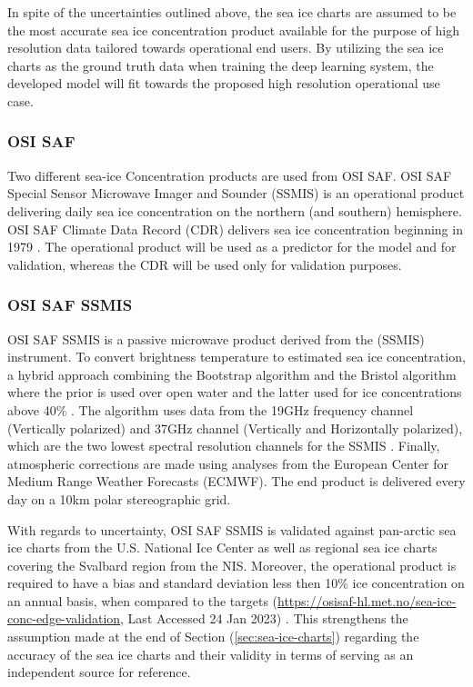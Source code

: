 \documentclass[../main/thesis.tex]{subfiles}
\begin{document}
In spite of the uncertainties outlined above, the sea ice charts are assumed to be the most accurate sea ice concentration product available for the purpose of high resolution data tailored towards operational end users. By utilizing the sea ice charts as the ground truth data when training the deep learning system, the developed model will fit towards the proposed high resolution operational use case.

\subsubsection{OSI SAF}
\label{sec:osisaf}
Two different sea-ice Concentration products are used from OSI SAF. OSI SAF Special Sensor Microwave Imager and Sounder (SSMIS) is an operational product delivering daily sea ice concentration on the northern (and southern) hemisphere. OSI SAF Climate Data Record (CDR) \citep{Soerensen2021} delivers sea ice concentration beginning in 1979 \citep{Lavergne2019}. The operational product will be used as a predictor for the model and for validation, whereas the CDR will be used only for validation purposes.

\subsubsection{OSI SAF SSMIS}
\label{sec:osisafssmis}
OSI SAF SSMIS is a passive microwave product derived from the (SSMIS) instrument. To convert brightness temperature to estimated sea ice concentration, a hybrid approach combining the Bootstrap algorithm \citep{Comiso1997} and the Bristol algorithm \citep{Smith1996} where the prior is used over open water and the latter used for ice concentrations above 40\% \citep{Tonboe2017}. The algorithm uses data from the 19GHz frequency channel (Vertically polarized) and 37GHz channel (Vertically and Horizontally polarized), which are the two lowest spectral resolution channels for the SSMIS \cite{Tonboe2017}. Finally, atmospheric corrections are made using analyses from the European Center for Medium Range Weather Forecasts (ECMWF). The end product is delivered every day on a 10km polar stereographic grid.

With regards to uncertainty, OSI SAF SSMIS is validated against pan-arctic sea ice charts from the U.S. National Ice Center as well as regional sea ice charts covering the Svalbard region from the NIS. Moreover, the operational product is required to have a bias and standard deviation less then 10\% ice concentration on an annual basis, when compared to the targets (\url{https://osisaf-hl.met.no/sea-ice-conc-edge-validation}, Last Accessed 24 Jan 2023) \citep{Lavelle2017}. This strengthens the assumption made at the end of Section (\ref{sec:sea-ice-charts}) regarding the accuracy of the sea ice charts and their validity in terms of serving as an independent source for reference.
\end{document}
